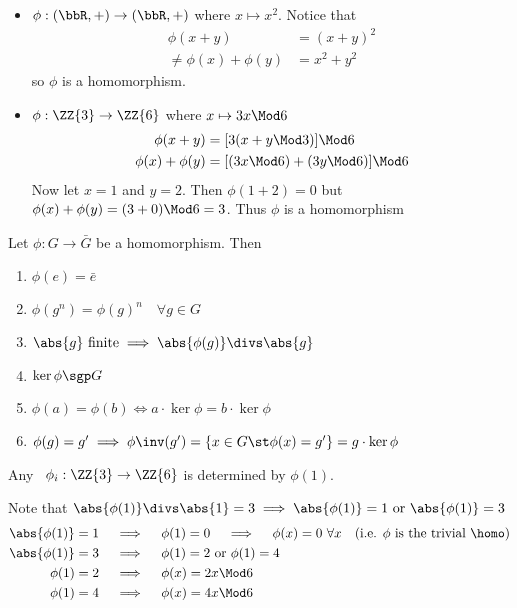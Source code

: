   \begin{nonexamples}
  \begin{itemize}
      \item \(\phi:(\bbR,+)\to (\bbR,+)\) where \(x\mapsto x^2\). Notice that
      \begin{align*}
          \phi(x+y)&=(x+y)^2 \\
          \neq \phi(x)+\phi(y) &= x^2+y^2
      \end{align*} so \(\phi\) is  a homomorphism.

      \item \(\phi:\ZZ{3}\to\ZZ{6}\) where \(x\mapsto 3x\Mod 6\)
      \begin{align*}
          \phi(x+y) &= [3(x+y\Mod 3)]\Mod 6 \\
          \phi(x)+\phi(y) &= [(3x\Mod 6) + (3y\Mod 6)]\Mod 6
      \end{align*}
      Now let \(x=1\) and \(y=2\). Then \(\phi(1+2)=0\) but \(\phi(x)+\phi(y)=(3+0)\Mod 6 = 3\). Thus \(\phi\) is  a homomorphism
  \end{itemize}
  \end{nonexamples}

  \begin{theorem}
      Let \(\phi: G\to\bar G\) be a homomorphism. Then
      \begin{enumerate}
          \item \(\phi(e)=\bar e\)
          \item \(\phi(g^n)=\phi(g)^n\quad \forall g\in G\)
          \item \(\abs{g}\text{ finite} \implies \abs{\phi(g)} \divs \abs{g}\)
          \item \(\ker\phi \sgp G\)
          \item \(\phi(a) = \phi(b) \iff a\cdot\ker\phi = b\cdot\ker\phi\)
          \item \(\phi(g)=g'\implies \phi\inv(g')=\{x\in G \st \phi(x)=g'\} = g\cdot \ker\phi\)
      \end{enumerate}
  \end{theorem}

  \begin{example}
      Any \homo\ \(\phi_i: \ZZ{3}\to\ZZ{6}\) is determined by \(\phi(1)\).

      Note that \(\abs{\phi (1)} \divs \abs{1} = 3 \implies \abs{\phi (1)}=1 \text{ or } \abs{\phi (1)}=3\)
      \begin{align*}
          \abs{\phi(1)} = 1 \quad &\implies \quad \phi(1)=0 \quad \implies \quad \phi(x)=0\ \forall x \quad \text{(i.e. \(\phi\) is the trivial \homo)} \\
          \abs{\phi(1)} = 3 \quad &\implies \quad \phi(1)=2 \text{ or } \phi(1)=4 \\
          \phi(1) = 2 \quad &\implies \quad \phi(x)=2x \Mod 6 \\
          \phi(1) = 4 \quad &\implies \quad \phi(x)=4x \Mod 6
      \end{align*}
  \end{example}

